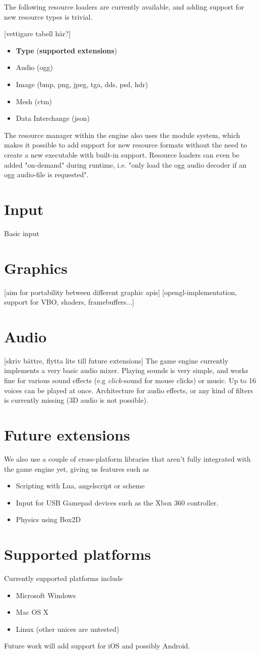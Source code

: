 The following resource loaders are currently available, and adding support for new resource types is trivial.

[vettigare tabell här?]
\begin{itemize}
\item \textbf{Type} (\textbf{supported extensions})
\item Audio (ogg)
\item Image (bmp, png, jpeg, tga, dds, psd, hdr)
\item Mesh (ctm)
\item Data Interchange (json)
\end{itemize}

The resource manager within the engine also uses the module system, which makes it possible to add support for new resource formats without the need to create a new executable with built-in support. Resource loaders can even be added "on-demand" during runtime, i.e. "only load the ogg audio decoder if an ogg audio-file is requested".

\section{Input}
Basic input

\section{Graphics}
[aim for portability between different graphic apis]
[opengl-implementation, support for VBO, shaders, framebuffers...]

\section{Audio}
[skriv bättre, flytta lite till future extensions]
The game engine currently implements a very basic audio mixer. Playing sounds is very simple, and works fine
for various sound effects (e.g \textit{click}-sound for mouse clicks) or music. Up to 16 voices can be played at once. Architecture for audio effects, or any kind of filters is currently missing (3D audio is not possible).

\section{Future extensions}

We also use a couple of cross-platform libraries that aren't fully integrated with the game engine yet, giving us features such as
\begin{itemize}
\item Scripting with Lua, angelscript or scheme
\item Input for USB Gamepad devices such as the Xbox 360 controller.
\item Physics using Box2D
\end{itemize}

\section{Supported platforms}
Currently supported platforms include
\begin{itemize}
\item Microsoft Windows
\item Mac OS X
\item Linux (other unices are untested)
\end{itemize}
Future work will add support for iOS and possibly Android.

